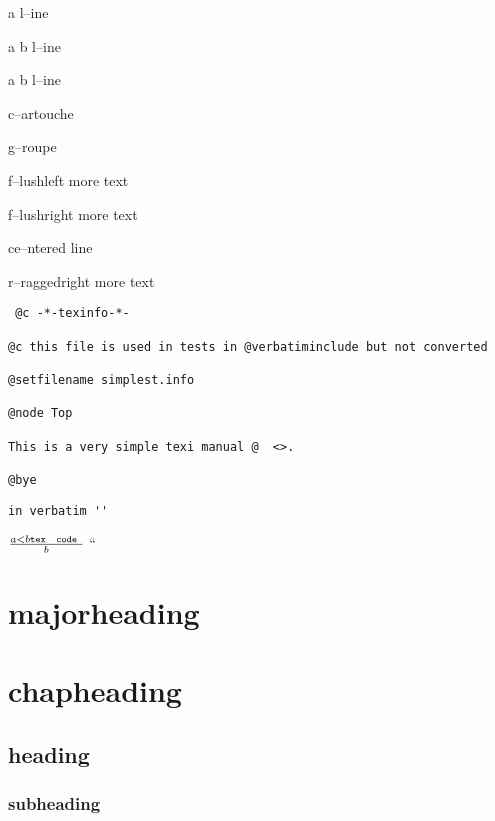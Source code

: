 \documentclass{book}
\newcommand{\GNUTexinfoplaceholder}[1]{}
\newcommand{\GNUTexinfonopagebreakheading}[2]{\let\clearpage\relax \let\cleardoublepage\relax \let\thispagestyle\GNUTexinfoplaceholder #1{#2}}
\begin{document}
a
l--ine

a
b
l--ine

a
b
l--ine

c--artouche

g--roupe

f--lushleft
more text

f--lushright
more text

\begin{center}
ce--ntered line
\end{center}

\begin{flushleft}
r--raggedright
more text
\end{flushleft}

\begin{verbatim}
 @c -*-texinfo-*-

@c this file is used in tests in @verbatiminclude but not converted

@setfilename simplest.info

@node Top

This is a very simple texi manual @  <>.

@bye
\end{verbatim}

\begin{verbatim}
in verbatim ''
\end{verbatim}





$\frac{a < b \texttt{tex \hbox{ code }}}{b}$ ``

\GNUTexinfonopagebreakheading{\chapter*}{majorheading}

\GNUTexinfonopagebreakheading{\chapter*}{chapheading}

\GNUTexinfonopagebreakheading{\section*}{heading}

\GNUTexinfonopagebreakheading{\subsection*}{subheading}
\end{document}
